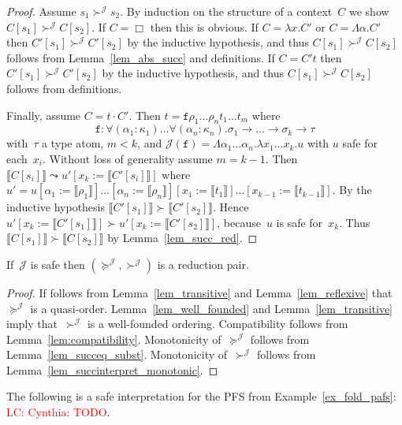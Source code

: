 \documentclass[a4paper,UKenglish,cleveref,autoref,numberwithinsect]{lipics-v2019}
\theoremstyle{definition}
\newcommand{\arrtype}{\rightarrow}
\newcommand{\app}[2]{#1 \cdot #2}
\newcommand{\subst}[2]{#1:=#2}
\newcommand{\abs}[2]{\lambda #1.#2}
\newcommand{\tabs}[2]{\Lambda #1.#2}
\newcommand{\typeinterpret}[1]{\llbracket #1 \rrbracket}
\newcommand{\interpret}[1]{\llbracket #1 \rrbracket}
\newcommand{\Termmap}{\mathcal{J}}
\newcommand{\succinterpret}{\succ^{\Termmap}}
\newcommand{\succeqinterpret}{\succeq^{\Termmap}}
\newcommand{\LC}[1]{\textcolor{red}{LC: #1}}
\begin{document}
\begin{proof}
  Assume $s_1 \succinterpret s_2$. By induction on the structure of a
  context~$C$ we show $C[s_1] \succinterpret C[s_2]$. If $C=\Box$ then
  this is obvious. If $C = \abs{x}{C'}$ or $C = \tabs{\alpha}{C'}$
  then $C'[s_1] \succinterpret C'[s_2]$ by the inductive hypothesis,
  and thus $C[s_1] \succinterpret C[s_2]$ follows from
  Lemma~\ref{lem_abs_succ} and definitions. If $C = C' t$ then
  $C'[s_1] \succinterpret C'[s_2]$ by the inductive hypothesis, and
  thus $C[s_1] \succinterpret C[s_2]$ follows from definitions.

  Finally, assume $C = \app{t}{C'}$. Then $t = \mathtt{f} \rho_1
  \ldots \rho_n t_1 \ldots t_m$ where
  \[
  \mathtt{f} : \forall (\alpha_1 : \kappa_1) \ldots \forall (\alpha_n
  : \kappa_n) . \sigma_1 \arrtype \ldots \arrtype \sigma_k \arrtype
  \tau
  \]
  with~$\tau$ a type atom, $m < k$, and $\Termmap(\mathtt{f}) =
  \tabs{\alpha_1 \dots \alpha_n}{\abs{x_1 \dots x_k}{u}}$ with $u$
  safe for each~$x_i$. Without loss of generality assume $m=k-1$. Then
  $\interpret{C[s_i]} \leadsto u'[\subst{x_k}{\interpret{C'[s_i]}}]$
  where
  $u'=u[\subst{\alpha_1}{\typeinterpret{\rho_1}}]\ldots[\subst{\alpha_n}{\typeinterpret{\rho_n}}][\subst{x_1}{\interpret{t_1}}]\ldots[\subst{x_{k-1}}{\interpret{t_{k-1}}}]$. By
  the inductive hypothesis $\interpret{C'[s_1]} \succ
  \interpret{C'[s_2]}$. Hence $u'[\subst{x_k}{\interpret{C'[s_1]}}]
  \succ u'[\subst{x_k}{\interpret{C'[s_2]}}]$, because~$u$ is safe
  for~$x_k$. Thus $\interpret{C[s_1]} \succ \interpret{C[s_2]}$ by
  Lemma~\ref{lem_succ_red}.
\end{proof}

\begin{theorem}\label{thm_reduction_pair}
  If~$\Termmap$ is safe then $(\succeqinterpret,\succinterpret)$ is a
  reduction pair.
\end{theorem}

\begin{proof}
  If follows from Lemma~\ref{lem_transitive} and
  Lemma~\ref{lem_reflexive} that~$\succeqinterpret$ is a
  quasi-order. Lemma~\ref{lem_well_founded} and
  Lemma~\ref{lem_transitive} imply that~$\succinterpret$ is a
  well-founded ordering. Compatibility follows from
  Lemma~\ref{lem:compatibility}. Monotonicity of~$\succeqinterpret$
  follows from Lemma~\ref{lem_succeq_subst}. Monotonicity
  of~$\succinterpret$ follows from
  Lemma~\ref{lem_succinterpret_monotonic}.
\end{proof}

\begin{example}\label{ex_fold_interpretation}
  The following is a safe interpretation for the PFS from
  Example~\ref{ex_fold_pafs}: \LC{Cynthia: TODO}.
\end{example}
\end{document}
